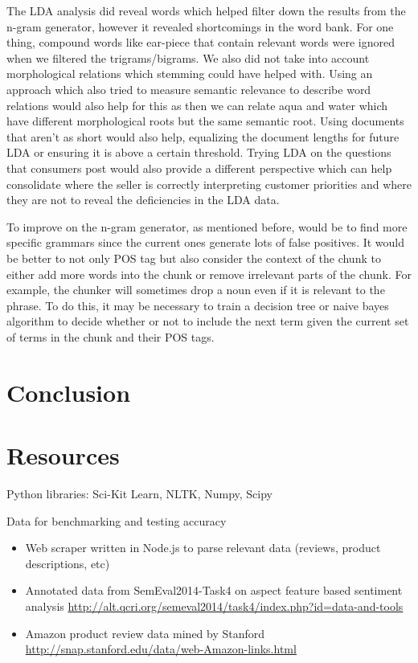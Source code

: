 \documentclass{article}
\begin{document}
The LDA analysis did reveal words which helped filter down the results from the n-gram generator, however it revealed shortcomings in the word bank. For one thing, compound words like ear-piece that contain relevant words were ignored when we filtered the trigrams/bigrams. We also did not take into account morphological relations which stemming could have helped with. Using an approach which also tried to measure semantic relevance to describe word relations would also help for this as then we can relate aqua and water which have different morphological roots but the same semantic root. Using documents that aren't as short would also help, equalizing the document lengths for future LDA or ensuring it is above a certain threshold. Trying LDA on the questions that consumers post would also provide a different perspective which can help consolidate where the seller is correctly interpreting customer priorities and where they are not to reveal the deficiencies in the LDA data. 

To improve on the n-gram generator, as mentioned before, would be to find more specific grammars since the current ones generate lots of false positives. It would be better to not only POS tag but also consider the context of the chunk to either add more words into the chunk or remove irrelevant parts of the chunk. For example, the chunker will sometimes drop a noun even if it is relevant to the phrase. To do this, it may be necessary to train a decision tree or naive bayes algorithm to decide whether or not to include the next term given the current set of terms in the chunk and their POS tags. 


\section{Conclusion}
\section{Resources}

Python libraries: Sci-Kit Learn, NLTK, Numpy, Scipy

Data for benchmarking and testing accuracy

\begin{itemize}
\item Web scraper written in Node.js to parse relevant data (reviews, product descriptions, etc)
\newline 

\item Annotated data from SemEval2014-Task4 on aspect feature based sentiment analysis
\newline
\url{http://alt.qcri.org/semeval2014/task4/index.php?id=data-and-tools}

\item Amazon product review data mined by Stanford
\newline
\url{http://snap.stanford.edu/data/web-Amazon-links.html}
\end{itemize}
\end{document}
